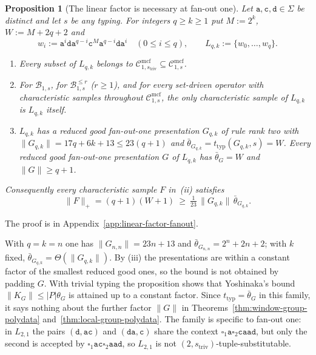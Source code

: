 \documentclass[11pt]{article}
\numberwithin{equation}{section}
\theoremstyle{plain}
\newtheorem{proposition}[theorem]{Proposition}
\theoremstyle{definition}
\theoremstyle{remark}
\newcommand{\Cmcf}[2]{\mathcal{C}^{\mathrm{mcf}}_{#1,#2}}
\newcommand{\blank}{\square}
\theoremstyle{plain}
\begin{document}
\begin{proposition}[The linear factor is necessary at fan-out one]
\label{prop:linear-factor-sharp}
Let $\mathtt a,\mathtt c,\mathtt d\in\Sigma$ be distinct and let $s$ be any
typing.  For integers $q\ge k\ge1$ put $M:=2^k$, $W:=M+2q+2$ and
\[
 w_i:=\mathtt a^i\mathtt d\mathtt a^{q-i}\mathtt c^M\mathtt a^{q-i}\mathtt d
 \mathtt a^i\quad(0\le i\le q),\qquad L_{q,k}:=\{w_0,\ldots,w_q\}.
\]
\begin{enumerate}[label=\textup{(\roman*)},leftmargin=*]
\item Every subset of $L_{q,k}$ belongs to
$\Cmcf{1}{s_{\mathrm{triv}}}\subseteq\Cmcf{1}{s}$.
\item For $\mathcal B_{1,s}$, for $\mathcal B^{\le r}_{1,s}$ \textup($r\ge1$\textup),
and for every set-driven operator with characteristic samples throughout
$\Cmcf{1}{s}$, the only characteristic sample of $L_{q,k}$ is $L_{q,k}$ itself.
\item $L_{q,k}$ has a reduced good fan-out-one presentation $G_{q,k}$ of rule
rank two with $\|G_{q,k}\|=17q+6k+13\le23(q+1)$ and
$\bar\theta_{G_{q,k}}=t_{\mathrm{typ}}(G_{q,k},s)=W$.  Every reduced good
fan-out-one presentation $G$ of $L_{q,k}$ has $\bar\theta_G=W$ and
$\|G\|\ge q+1$.
\end{enumerate}
Consequently every characteristic sample $F$ in~\textup{(ii)} satisfies
\[
 \|F\|_+=(q+1)(W+1)\ \ge\ \tfrac1{23}\,\|G_{q,k}\|\,\bar\theta_{G_{q,k}}.
\]
\end{proposition}

The proof is in Appendix~\ref{app:linear-factor-fanout}.

With $q=k=n$ one has $\|G_{n,n}\|=23n+13$ and $\bar\theta_{G_{n,n}}=2^n+2n+2$;
with $k$ fixed, $\bar\theta_{G_{q,k}}=\Theta(\|G_{q,k}\|)$.  By (iii) the
presentations are within a constant factor of the smallest reduced good ones,
so the bound is not obtained by padding $G$.  With trivial typing the
proposition shows that Yoshinaka's bound $\|K_G\|\le|P|\theta_G$ is attained
up to a constant factor.  Since $t_{\mathrm{typ}}=\bar\theta_G$ in this family,
it says nothing about the further factor $\|G\|$ in
Theorems~\ref{thm:window-group-polydata} and~\ref{thm:local-group-polydata}.
The family is specific to fan-out one: in $L_{2,1}$ the pairs
$(\mathtt d,\mathtt{ac})$ and $(\mathtt{da},\mathtt c)$ share the context
$\blank_1\mathtt a\blank_2\mathtt{caad}$, but only the second is accepted by
$\blank_1\mathtt{ac}\blank_2\mathtt{aad}$, so $L_{2,1}$ is not
$(2,s_{\mathrm{triv}})$-tuple-substitutable.
\end{document}
